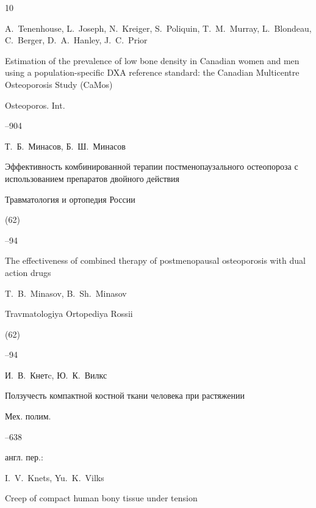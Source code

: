 \begin{thebibliography}{10}

\by A.~Tenenhouse, L.~Joseph, N.~Kreiger, S.~Poliquin, T.~M.~Murray, L.~Blondeau, C.~Berger, D.~A.~Hanley, J.~C.~Prior

\paper Estimation of the prevalence of low bone density in Canadian women and men using a population-specific DXA reference standard: the Canadian Multicentre Osteoporosis Study (CaMos)

\jour Osteoporos. Int.  




--904






\by Т.~Б.~Минасов, Б.~Ш.~Минасов

\paper Эффективность комбинированной терапии постменопаузального остеопороза с использованием препаратов двойного действия

\jour Травматология и ортопедия России


(62)

--94

\misctransl

\paper The effectiveness of combined therapy of postmenopausal osteoporosis with dual action drugs

\by T.~B.~Minasov, B.~Sh.~Minasov

\jour Travmatologiya Ortopediya Rossii


(62)

--94








\by И.~В.~Кнетc, Ю.~К.~Вилкс

\paper Ползучесть компактной костной ткани человека при растяжении

\jour Мех. полим.



--638

\transl англ. пер.:~

\by I.~V.~Knets, Yu.~K.~Vilks

\paper Creep of compact human bony tissue under tension


\end{thebibliography}
